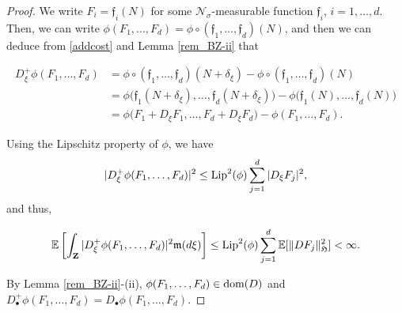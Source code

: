 \documentclass[letterpaper, 11pt,  reqno]{amsart}
\newcommand{\noi}{\noindent}
\newcommand{\bul}{\bullet}
\newcommand{\bE}{\mathbb{E}}
\newcommand{\ff}{\mathfrak{f}}
\newcommand{\scrN}{\mathscr{N}}
\newcommand{\s}{\sigma}
\newcommand{\fm}{\mathfrak{m}}
\newcommand{\fH}{\mathfrak{H}}
\newcommand{\dom}{\textup{dom}}
\numberwithin{equation}{section}
\numberwithin{theorem}{section}
\begin{document}
\begin{proof}  
We write $F_i=\ff_i(N)$ for some $\scrN_\s$-measurable function $\ff_i$,
 $i=1,\ldots,d$. Then, we can write
 $\phi(F_1,\ldots,F_d)= \phi \circ (\ff_1,\ldots,\ff_d)(N)$, and  then
 we can deduce from \eqref{addcost} and Lemma \ref{rem_BZ-ii} that 
 
 \noi
\begin{align*}
D_{\xi}^+\phi(F_1,\ldots,F_d)
&= \phi \circ (\ff_1,\ldots,\ff_d)(N+\delta_{\xi})
   -  \phi \circ (\ff_1,\ldots,\ff_d)(N)\\
&=\phi\big(\ff_1(N+\delta_{\xi}), \ldots,\ff_d(N+\delta_{\xi})\big)-\phi\big(\ff_1(N),\ldots,\ff_d(N) \big)\\
&=\phi\big(F_1+D_{\xi}F_1,\ldots, F_d+D_{\xi}F_d\big)-\phi(F_1,\ldots, F_d).
\end{align*}


\noi
Using the Lipschitz property of $\phi$, we have
\begin{align}\label{2_LIP}
|D_{\xi}^+\phi(F_1,\ldots,F_d)|^2
 \leq 
\textup{Lip}^2(\phi)\sum_{j=1}^{d} |D_{\xi}F_j|^2,
\end{align}
 and thus,
 
 \noi
\begin{align} \notag %
\bE \left[\int_{\mathbf{Z}}|D_{\xi}^+\phi(F_1,\ldots,F_d)|^2\fm(d\xi)\right] 
\leq \textup{Lip}^2(\phi)\sum_{j=1}^{d} \bE[\|DF_j\|_{\fH}^2]<\infty.
\end{align}

\noi
By Lemma \ref{rem_BZ-ii}-(ii), $\phi(F_1,\ldots,F_d) \in \dom(D)$ and
$D^{+}_\bul \phi(F_1,\ldots,F_d)=D_\bul \phi(F_1,\ldots,F_d)$.
 \qedhere
 
 
\end{proof}


\end{document}
